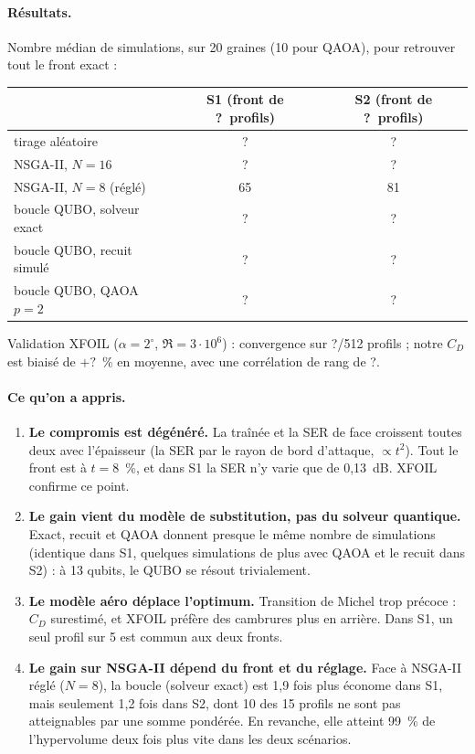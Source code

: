 \documentclass[11pt,a4paper]{report}
\providecommand{\VunSunFront}{?}\providecommand{\VunSunNsga}{?}\providecommand{\VunSunExact}{?}\providecommand{\VunSunRecuit}{?}\providecommand{\VunSunQaoa}{?}\providecommand{\VunSunHasard}{?}\providecommand{\VunXfConv}{?}\providecommand{\VunXfBiaisCD}{?}\providecommand{\VunXfRangCD}{?}
\providecommand{\VunSdeuxFront}{?}\providecommand{\VunSdeuxNsga}{?}\providecommand{\VunSdeuxExact}{?}
\providecommand{\VunSdeuxRecuit}{?}\providecommand{\VunSdeuxQaoa}{?}\providecommand{\VunSdeuxHasard}{?}
\begin{document}
\paragraph{Résultats.} Nombre médian de simulations, sur 20 graines (10 pour QAOA), pour retrouver tout le front exact :
\begin{center}
\begin{tabular}{lcc}
\toprule
 & S1 (front de \VunSunFront\ profils) & S2 (front de \VunSdeuxFront\ profils) \\
\midrule
tirage aléatoire & \VunSunHasard & \VunSdeuxHasard \\
NSGA-II, $N=16$ & \VunSunNsga & \VunSdeuxNsga \\
NSGA-II, $N=8$ (réglé) & 65 & 81 \\
boucle QUBO, solveur exact & \VunSunExact & \VunSdeuxExact \\
boucle QUBO, recuit simulé & \VunSunRecuit & \VunSdeuxRecuit \\
boucle QUBO, QAOA $p=2$ & \VunSunQaoa & \VunSdeuxQaoa \\
\bottomrule
\end{tabular}
\end{center}
Validation XFOIL ($\alpha=2^\circ$, $\Re=3\cdot10^6$) : convergence sur \VunXfConv/512 profils ; notre $C_D$ est biaisé de $+\VunXfBiaisCD$~\% en moyenne, avec une corrélation de rang de \VunXfRangCD.

\paragraph{Ce qu'on a appris.}
\begin{enumerate}
\item \textbf{Le compromis est dégénéré.} La traînée et la SER de face croissent toutes deux avec l'épaisseur (la SER par le rayon de bord d'attaque, $\propto t^2$). Tout le front est à $t=8$~\%, et dans S1 la SER n'y varie que de 0,13~dB. XFOIL confirme ce point.
\item \textbf{Le gain vient du modèle de substitution, pas du solveur quantique.} Exact, recuit et QAOA donnent presque le même nombre de simulations (identique dans S1, quelques simulations de plus avec QAOA et le recuit dans S2) : à 13 qubits, le QUBO se résout trivialement.
\item \textbf{Le modèle aéro déplace l'optimum.} Transition de Michel trop précoce : $C_D$ surestimé, et XFOIL préfère des cambrures plus en arrière. Dans S1, un seul profil sur 5 est commun aux deux fronts.
\item \textbf{Le gain sur NSGA-II dépend du front et du réglage.} Face à NSGA-II réglé ($N=8$), la boucle (solveur exact) est 1,9 fois plus économe dans S1, mais seulement 1,2 fois dans S2, dont 10 des 15 profils ne sont pas atteignables par une somme pondérée. En revanche, elle atteint 99~\% de l'hypervolume deux fois plus vite dans les deux scénarios.
\end{enumerate}
\end{document}
